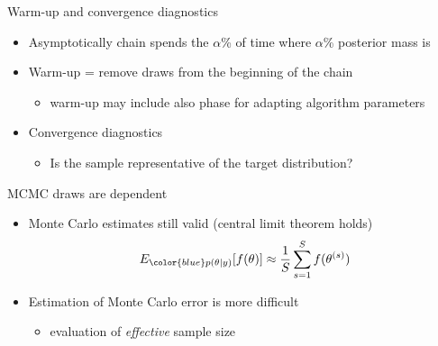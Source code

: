 \documentclass[finnish,english,t]{beamer}
\begin{document}
\begin{frame}{Warm-up and convergence diagnostics}

  \begin{itemize}
  \item Asymptotically chain spends the $\alpha$\% of time where
    $\alpha$\% posterior mass is
      \vspace{-.5\baselineskip}
    \item<3-> Warm-up = remove draws from the beginning of the chain
      \begin{itemize}
      \item warm-up may include also phase for adapting algorithm parameters
      \end{itemize}
    \item<4-> Convergence diagnostics 
      \begin{itemize}
      \item Is the sample representative of the target distribution?
      \end{itemize}
  \end{itemize}

\end{frame}

\begin{frame}{MCMC draws are dependent}

  \begin{itemize}
    \item Monte Carlo estimates still valid (central limit theorem holds)
      \begin{align*}
        E_{\color{blue} p(\theta \mid y)}[f(\theta)] \approx \frac{1}{S} \sum_{s=1}^S f(\theta^{(s)})
      \end{align*}
    \item Estimation of Monte Carlo error is more difficult
      \begin{itemize}
      \item evaluation of {\it effective} sample size
      \end{itemize}
    \end{itemize}  

\end{frame}
\end{document}
